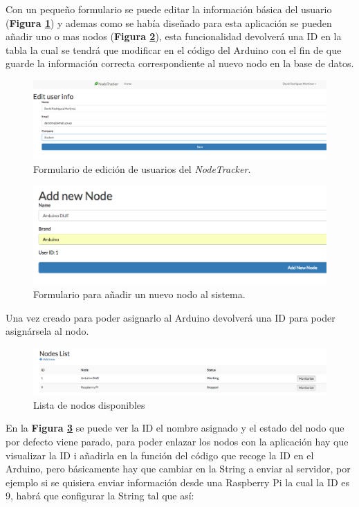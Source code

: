 Con un pequeño formulario se puede editar la información básica del usuario (\textbf{Figura \ref{fig:editusernode}}) y ademas como se había diseñado para esta aplicación se pueden añadir uno o mas nodos (\textbf{Figura \ref{fig:addnode}}), esta funcionalidad devolverá una ID en la tabla la cual se tendrá que modificar en el código del Arduino con el fin de que guarde la información correcta correspondiente al nuevo nodo en la base de datos. 

\begin{figure}[!h]
	\centering
	\includegraphics[width=0.7\linewidth]{figuras/edituser}
	\caption{Formulario de edición de usuarios del \textit{NodeTracker}.}
	\label{fig:editusernode}
\end{figure}

\begin{figure}[!h]
	\centering
	\includegraphics[width=0.7\linewidth]{figuras/addnode}
	\caption{Formulario para añadir un nuevo nodo al sistema.}
	\label{fig:addnode}
\end{figure}

Una vez creado para poder asignarlo al Arduino devolverá una ID para poder asignársela al nodo.

\begin{figure}[!h]
	\centering
	\includegraphics[width=1.0\linewidth]{figuras/nodelist}
	\caption{Lista de nodos disponibles}
	\label{fig:nodelist}
\end{figure}

En la \textbf{Figura \ref{fig:nodelist}} se puede ver la ID el nombre asignado y el estado del nodo que por defecto viene parado, para poder enlazar los nodos con la aplicación hay que visualizar la ID i añadirla en la función del código que recoge la ID en el Arduino, pero básicamente hay que cambiar en la String a enviar al servidor, por ejemplo si se quisiera enviar información desde una Raspberry Pi la cual la ID es 9, habrá que configurar la String tal que así:

